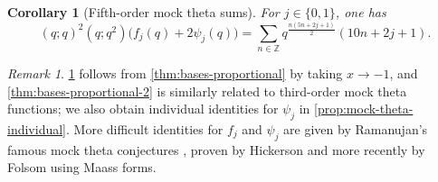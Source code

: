 \documentclass[reqno,11pt]{amsart}
\newtheorem{corollary}[theorem]{Corollary}
\theoremstyle{definition}
\theoremstyle{remark}
\newtheorem*{remark}{Remark}
\numberwithin{equation}{section}
\newcommand{\Z}{\mathbb{Z}}
\newcommand{\la}{\left\langle}
\newcommand{\ra}{\right\rangle}
\newcommand{\fix}[1]{\textcolor{blue}{\large (#1)\normalsize}}
\begin{document}
\begin{corollary}[Fifth-order mock theta sums]\label{cor:mock-theta-fifth}
For $j \in \{0, 1\}$, one has
\[
    (q; q)^2\left(q; q^2\right)\Big( f_j(q) + 2\psi_j(q) \Big) =  \sum_{n \in \Z} q^{\frac{n(5n+2j+1)}{2}} (10 n + 2j + 1).
\]
\end{corollary}
\begin{remark}
\cref{cor:mock-theta-fifth} follows from \cref{thm:bases-proportional} by taking $x \to -1$, and \cref{thm:bases-proportional-2} is similarly related to third-order mock theta functions; we also obtain individual identities for $\psi_j$ in \cref{prop:mock-theta-individual}. More difficult identities for $f_j$ and $\psi_j$ are given by Ramanujan's famous mock theta conjectures \cite{andrews1989ramanujan}, proven by Hickerson \cite{hickerson1988proof} and more recently by Folsom \cite{folsom2008short} using Maass forms.
\end{remark}
\end{document}
